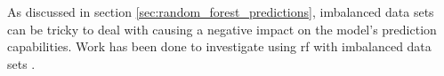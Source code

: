 As discussed in section \ref{sec:random_forest_predictions}, imbalanced data sets can be tricky to deal with causing a negative impact on the model's prediction capabilities. Work has been done to investigate using \gls{rf} with imbalanced data sets \cite{Khoshgoftaar2007}. %






